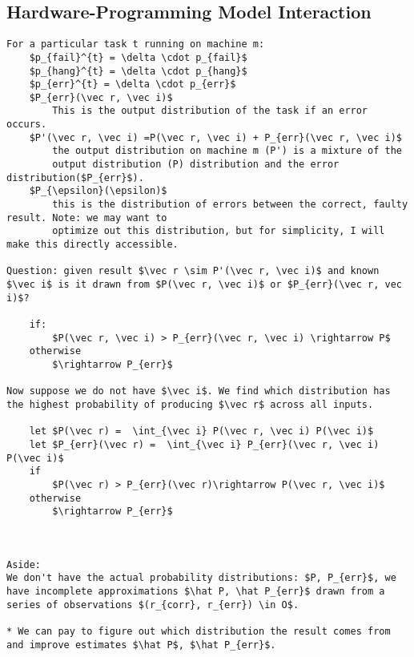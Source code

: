 \documentclass[11pt, oneside]{article}   	%
\begin{document}
\subsection {Hardware-Programming Model Interaction}
\begin{lstlisting}[mathescape]
For a particular task t running on machine m:
	$p_{fail}^{t} = \delta \cdot p_{fail}$
	$p_{hang}^{t} = \delta \cdot p_{hang}$
	$p_{err}^{t} = \delta \cdot p_{err}$
	$P_{err}(\vec r, \vec i)$
		This is the output distribution of the task if an error occurs.
	$P'(\vec r, \vec i) =P(\vec r, \vec i) + P_{err}(\vec r, \vec i)$
		the output distribution on machine m (P') is a mixture of the  
		output distribution (P) distribution and the error distribution($P_{err}$).
	$P_{\epsilon}(\epsilon)$
		this is the distribution of errors between the correct, faulty result. Note: we may want to
		optimize out this distribution, but for simplicity, I will make this directly accessible.
		
Question: given result $\vec r \sim P'(\vec r, \vec i)$ and known $\vec i$ is it drawn from $P(\vec r, \vec i)$ or $P_{err}(\vec r, vec i)$?

	if:
		$P(\vec r, \vec i) > P_{err}(\vec r, \vec i) \rightarrow P$
	otherwise
		$\rightarrow P_{err}$
	
Now suppose we do not have $\vec i$. We find which distribution has the highest probability of producing $\vec r$ across all inputs.

	let $P(\vec r) =  \int_{\vec i} P(\vec r, \vec i) P(\vec i)$
	let $P_{err}(\vec r) =  \int_{\vec i} P_{err}(\vec r, \vec i) P(\vec i)$
	if
		$P(\vec r) > P_{err}(\vec r)\rightarrow P(\vec r, \vec i)$
	otherwise
		$\rightarrow P_{err}$
	


Aside:
We don't have the actual probability distributions: $P, P_{err}$, we have incomplete approximations $\hat P, \hat P_{err}$ drawn from a series of observations $(r_{corr}, r_{err}) \in O$. 

* We can pay to figure out which distribution the result comes from and improve estimates $\hat P$, $\hat P_{err}$. 
\end{lstlisting}
\end{document}
